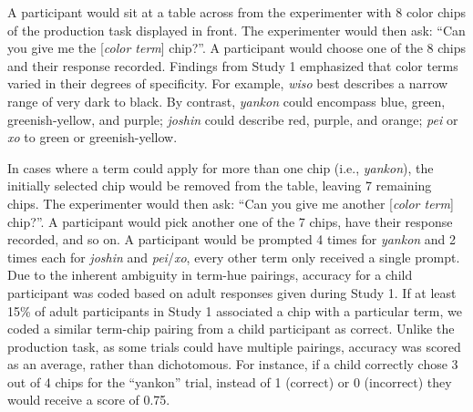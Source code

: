 \documentclass[
  english,
  ,man,floatsintext]{apa6}
\begin{document}
A participant would sit at a table across from the experimenter with 8 color chips of the production task displayed in front. The experimenter would then ask: \enquote{Can you give me the {[}\emph{color term}{]} chip?}. A participant would choose one of the 8 chips and their response recorded. Findings from Study 1 emphasized that color terms varied in their degrees of specificity. For example, \emph{wiso} best describes a narrow range of very dark to black. By contrast, \emph{yankon} could encompass blue, green, greenish-yellow, and purple; \emph{joshin} could describe red, purple, and orange; \emph{pei} or \emph{xo} to green or greenish-yellow.

In cases where a term could apply for more than one chip (i.e., \emph{yankon}), the initially selected chip would be removed from the table, leaving 7 remaining chips. The experimenter would then ask: \enquote{Can you give me another {[}\emph{color term}{]} chip?}. A participant would pick another one of the 7 chips, have their response recorded, and so on. A participant would be prompted 4 times for \emph{yankon} and 2 times each for \emph{joshin} and \emph{pei}/\emph{xo}, every other term only received a single prompt. Due to the inherent ambiguity in term-hue pairings, accuracy for a child participant was coded based on adult responses given during Study 1. If at least 15\% of adult participants in Study 1 associated a chip with a particular term, we coded a similar term-chip pairing from a child participant as correct. Unlike the production task, as some trials could have multiple pairings, accuracy was scored as an average, rather than dichotomous. For instance, if a child correctly chose 3 out of 4 chips for the \enquote{yankon} trial, instead of 1 (correct) or 0 (incorrect) they would receive a score of 0.75.
\end{document}
